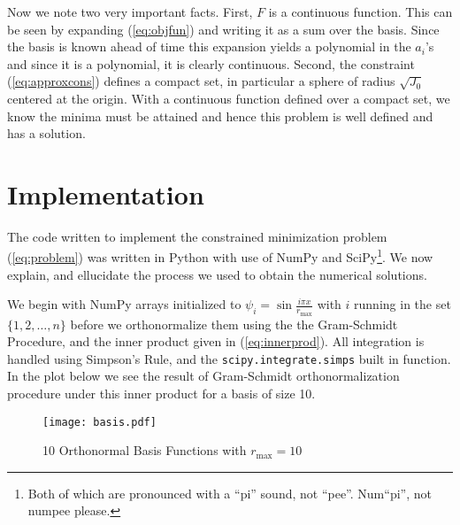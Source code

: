 Now we note two very important facts. First, $F$ is a continuous function. This can be seen by expanding (\ref{eq:objfun}) and writing it as a sum over the basis. Since the basis is known ahead of time this expansion yields a polynomial in the $a_i$'s and since it is a polynomial, it is clearly continuous. Second, the constraint (\ref{eq:approxcons}) defines a compact set, in particular a sphere of radius $\sqrt{J_0}$ centered at the origin. With a continuous function defined over a compact set, we know the minima must be attained and hence this problem is well defined and has a solution.


\section{Implementation}\label{sec:imp}
The code written to implement the constrained minimization problem (\ref{eq:problem}) was written in Python with use of NumPy and SciPy\footnote{Both of which are pronounced with a ``pi'' sound, not ``pee''. Num``pi'', not numpee please.}. We now explain, and ellucidate the process we used to obtain the numerical solutions.

We begin with NumPy arrays initialized to $\psi_i = \sin{\frac{i\pi x}{r_\text{max}}}$ with $i$ running in the set $\{1,2,\ldots, n\}$ before we orthonormalize them using the  the Gram-Schmidt Procedure, and the inner product given in (\ref{eq:innerprod}). All integration is handled using Simpson's Rule, and the \texttt{scipy.integrate.simps} built in function. In the plot below we see the result of Gram-Schmidt orthonormalization procedure under this inner product for a basis of size 10.
\begin{figure}[H]
\centering
  \texttt{[image: basis.pdf]}
  \caption{10 Orthonormal Basis Functions with $r_\text{max} = 10$}
  \label{fig:basis}
\end{figure}

